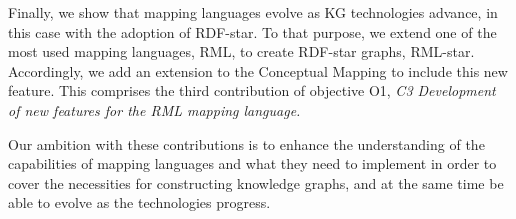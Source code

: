Finally, we show that mapping languages evolve as KG technologies advance, in this case with the adoption of RDF-star. To that purpose, we extend one of the most used mapping languages, RML, to create RDF-star graphs, RML-star. Accordingly, we add an extension to the Conceptual Mapping to include this new feature. This comprises the third contribution of objective O1, \textit{C3 Development of new features for the RML mapping language.}

Our ambition with these contributions is to enhance the understanding of the capabilities of mapping languages and what they need to implement in order to cover the necessities for constructing knowledge graphs, and at the same time be able to evolve as the technologies progress.